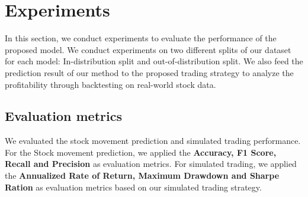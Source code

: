\documentclass{article}
\begin{document}
\section{Experiments}
In this section, we conduct experiments to evaluate the performance of the proposed model. We conduct experiments on two different splits of our dataset for each model: In-distribution split and out-of-distribution split. We also feed the prediction result of our method to the proposed trading strategy to analyze the profitability through backtesting on real-world stock data. 

































\subsection{Evaluation metrics}
We evaluated the stock movement prediction and simulated trading performance. For the Stock movement prediction, we applied the \textbf{Accuracy, F1 Score, Recall and Precision} as evaluation metrics. For simulated trading, we applied the \textbf{Annualized Rate of Return, Maximum Drawdown and Sharpe Ration} as evaluation metrics based on our simulated trading strategy.
\end{document}
